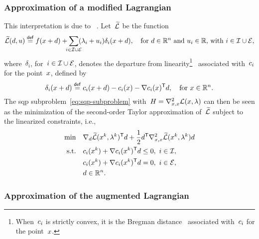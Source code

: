\subsubsection{Approximation of a modified Lagrangian}

This interpretation is due to \citeauthor{Robinson_1972a}~\cite[Rem.~4]{Robinson_1972a}.
Let~$\widetilde{\lag}$ be the function
\begin{equation*}
    \widetilde{\lag}(\step, u) \eqdef \obj(\iter + d) + \sum_{\mathclap{i \in \iub \cup \ieq}} (\lm_i + u_i) \delta_i(\iter + \step), \quad \text{for~$\step \in \R^n$ and~$u_i \in \R$, with~$i \in \iub \cup \ieq$},
\end{equation*}
where~$\delta_i$, for~$i \in \mathcal{I} \cup \mathcal{E}$, denotes the departure from linearity\footnote{When~$c_{i}$ is strictly convex, it is the Bregman distance~\cite{Bregman_1967} associated with~$c_{i}$ for the point~$\iter$.}~\cite{Hoek_1982} associated with~$c_{i}$ for the point~$\iter$, defined by
\begin{equation*}
    \delta_i(\iter + \step) \eqdef \con{i}(\iter + \step) - \con{i}(\iter) - \nabla \con{i}(\iter)^{\T} \step, \quad \text{for~$\iter \in \R^n$.}
\end{equation*}
The \gls{sqp} subproblem~\cref{eq:sqp-subproblem} with~$H = \nabla_{x, x}^2 \lag(\iter, \lm)$ can then be seen as the minimization of the second-order Taylor approximation of~$\widetilde{\lag}$ subject to the linearized constraints, i.e.,
\begin{align*}
    \min        & \quad \nabla_d \widetilde{\lag}(\iter[k], \lm[k])^{\T} \step + \frac{1}{2} \step^{\T} \nabla_{x, x}^2 \widetilde{\lag}(\iter[k], \lm[k]) \step\\
    \text{s.t.} & \quad \con{i}(\iter[k]) + \nabla \con{i}(\iter[k])^{\T} \step \le 0, ~ i \in \iub,\\
                & \quad \con{i}(\iter[k]) + \nabla \con{i}(\iter[k])^{\T} \step = 0, ~ i \in \ieq,\\
                & \quad \step \in \R^n.
\end{align*}

\subsubsection{Approximation of the augmented Lagrangian}

